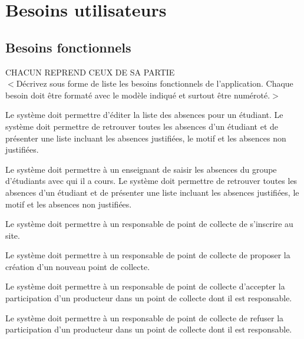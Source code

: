 \chapter{Besoins utilisateurs}

\section{Besoins fonctionnels}
CHACUN REPREND CEUX DE SA PARTIE\\
$<$Décrivez sous forme de liste les besoins fonctionnels de l'application. Chaque besoin doit être formaté avec le modèle indiqué et surtout être numéroté.$>$


\begin{reqs}{Le système doit permettre d'éditer la liste des absences pour un étudiant.}
Le système doit permettre de retrouver toutes les absences d'un étudiant et de présenter une liste incluant les absences justifiées, le motif et les absences non justifiées.
\end{reqs}

\begin{reqs}{Le système doit permettre à un enseignant de saisir les absences du groupe d'étudiants avec qui il a cours.}
Le système doit permettre de retrouver toutes les absences d'un étudiant et de présenter une liste incluant les absences justifiées, le motif et les absences non justifiées.
\end{reqs}


\begin{reqs}{Le système doit permettre à un responsable de point de collecte de s’inscrire au site.}
\end{reqs}

\begin{reqs}{Le système doit permettre à un responsable de point de collecte de proposer la création d’un nouveau point de collecte.}
\end{reqs}

\begin{reqs}{Le système doit permettre à un responsable de point de collecte d’accepter la participation d’un producteur dans un point de collecte dont il est responsable.}
\end{reqs}

\begin{reqs}{Le système doit permettre à un responsable de point de collecte de refuser la participation d’un producteur dans un point de collecte dont il est responsable.}
\end{reqs}

